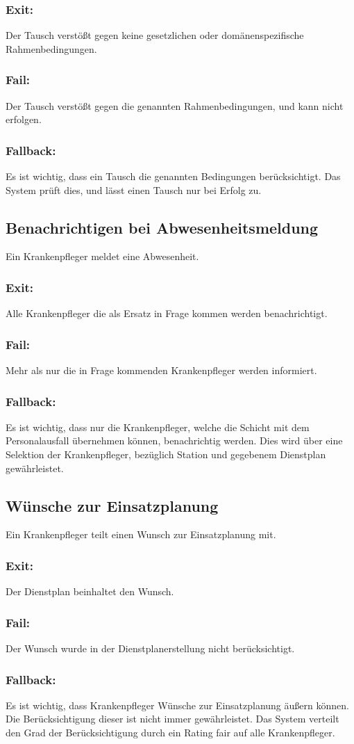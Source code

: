 \documentclass[10pt,a4paper]{article}
\begin{document}
\subsubsection{Exit:}
Der Tausch verstößt gegen keine gesetzlichen oder domänenspezifische Rahmenbedingungen.
\subsubsection{Fail:}
Der Tausch verstößt gegen die genannten Rahmenbedingungen, und kann nicht erfolgen.
\subsubsection{Fallback:}
Es ist wichtig, dass ein Tausch die genannten Bedingungen berücksichtigt. Das System prüft dies, und lässt einen Tausch nur bei Erfolg zu.
\subsection{Benachrichtigen bei Abwesenheitsmeldung}
Ein Krankenpfleger meldet eine Abwesenheit.
\subsubsection{Exit:}
Alle Krankenpfleger die als Ersatz in Frage kommen werden benachrichtigt. 
\subsubsection{Fail:}
Mehr als nur die in Frage kommenden Krankenpfleger werden informiert.
\subsubsection{Fallback:}
Es ist wichtig, dass nur die Krankenpfleger, welche die Schicht mit dem Personalausfall übernehmen können, benachrichtig werden. Dies wird über eine Selektion der Krankenpfleger, bezüglich Station und gegebenem Dienstplan gewährleistet.
\subsection{Wünsche zur Einsatzplanung}
Ein Krankenpfleger teilt einen Wunsch zur Einsatzplanung mit.
\subsubsection{Exit:}
Der Dienstplan beinhaltet den Wunsch. 
\subsubsection{Fail:}
Der Wunsch wurde in der Dienstplanerstellung nicht berücksichtigt.
\subsubsection{Fallback:}
Es ist wichtig, dass Krankenpfleger Wünsche zur Einsatzplanung äußern können. Die Berücksichtigung dieser ist nicht immer gewährleistet. Das System verteilt den Grad der Berücksichtigung durch ein Rating fair auf alle Krankenpfleger.
\end{document}
